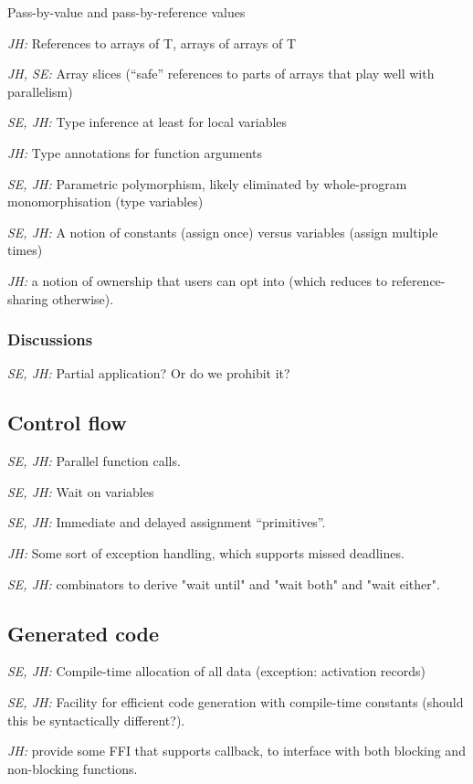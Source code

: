 \documentclass{article}
\begin{document}
Pass-by-value and pass-by-reference values

\textit{JH:} References to arrays of T, arrays of arrays of T

\textit{JH, SE:} Array slices (``safe'' references to parts of arrays that play
well with parallelism)

\textit{SE, JH:} Type inference at least for local variables

\textit{JH:} Type annotations for function arguments

\textit{SE, JH:} Parametric polymorphism, likely eliminated by whole-program
monomorphisation (type variables)

\textit{SE, JH:} A notion of constants (assign once) versus variables (assign
multiple times)

\textit{JH:} a notion of ownership that users can opt into (which reduces to
reference-sharing otherwise).

\subsubsection{Discussions}

\textit{SE, JH:} Partial application?  Or do we prohibit it?

\subsection{Control flow}

\textit{SE, JH:} Parallel function calls.

\textit{SE, JH:} Wait on variables

\textit{SE, JH:} Immediate and delayed assignment ``primitives''.

\textit{JH:} Some sort of exception handling, which supports missed deadlines.

\textit{SE, JH:} combinators to derive "wait until" and "wait both" and "wait either".

\subsection{Generated code}

\textit{SE, JH:} Compile-time allocation of all data (exception: activation records)

\textit{SE, JH:} Facility for efficient code generation with compile-time
constants (should this be syntactically different?).

\textit{JH:} provide some FFI that supports callback, to interface with both
blocking and non-blocking functions.
\end{document}
